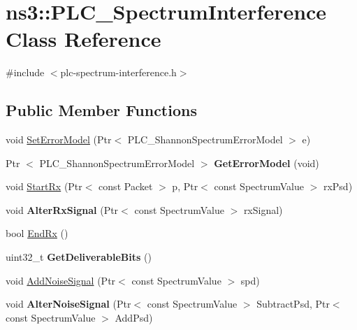 \hypertarget{classns3_1_1PLC__SpectrumInterference}{\section{ns3\-:\-:\-P\-L\-C\-\_\-\-Spectrum\-Interference \-Class \-Reference}
\label{classns3_1_1PLC__SpectrumInterference}
}


{\ttfamily \#include $<$plc-\/spectrum-\/interference.\-h$>$}

\subsection*{\-Public \-Member \-Functions}
\begin{DoxyCompactItemize}
\item 
void \hyperlink{classns3_1_1PLC__SpectrumInterference_ad7f137c6b42e539575c8ceb5cb73edd8}{\-Set\-Error\-Model} (\-Ptr$<$ \-P\-L\-C\-\_\-\-Shannon\-Spectrum\-Error\-Model $>$ e)
\item 
\hypertarget{classns3_1_1PLC__SpectrumInterference_a92a1612a234f5d9e4faa3e8ce7d11fa4}{\-Ptr\*
$<$ \-P\-L\-C\-\_\-\-Shannon\-Spectrum\-Error\-Model $>$ {\bfseries \-Get\-Error\-Model} (void)}\label{classns3_1_1PLC__SpectrumInterference_a92a1612a234f5d9e4faa3e8ce7d11fa4}

\item 
void \hyperlink{classns3_1_1PLC__SpectrumInterference_a8aa4bf9fe22792e67c4c02367edc626c}{\-Start\-Rx} (\-Ptr$<$ const \-Packet $>$ p, \-Ptr$<$ const \-Spectrum\-Value $>$ rx\-Psd)
\item 
\hypertarget{classns3_1_1PLC__SpectrumInterference_a28bfb5646b677079e3716df2fc2a7200}{void {\bfseries \-Alter\-Rx\-Signal} (\-Ptr$<$ const \-Spectrum\-Value $>$ rx\-Signal)}\label{classns3_1_1PLC__SpectrumInterference_a28bfb5646b677079e3716df2fc2a7200}

\item 
bool \hyperlink{classns3_1_1PLC__SpectrumInterference_a11dda8387b88020a7244323d991cfbe4}{\-End\-Rx} ()
\item 
\hypertarget{classns3_1_1PLC__SpectrumInterference_ae0ec77fb38725d4328e4b336ad200ea3}{uint32\-\_\-t {\bfseries \-Get\-Deliverable\-Bits} ()}\label{classns3_1_1PLC__SpectrumInterference_ae0ec77fb38725d4328e4b336ad200ea3}

\item 
void \hyperlink{classns3_1_1PLC__SpectrumInterference_ac62fe0cb4f954f2b3ec3050821d6d1a6}{\-Add\-Noise\-Signal} (\-Ptr$<$ const \-Spectrum\-Value $>$ spd)
\item 
\hypertarget{classns3_1_1PLC__SpectrumInterference_a234dd430982bf212771841af9907cd75}{void {\bfseries \-Alter\-Noise\-Signal} (\-Ptr$<$ const \-Spectrum\-Value $>$ \-Subtract\-Psd, \-Ptr$<$ const \-Spectrum\-Value $>$ \-Add\-Psd)}\label{classns3_1_1PLC__SpectrumInterference_a234dd430982bf212771841af9907cd75}


\end{DoxyCompactItemize}

